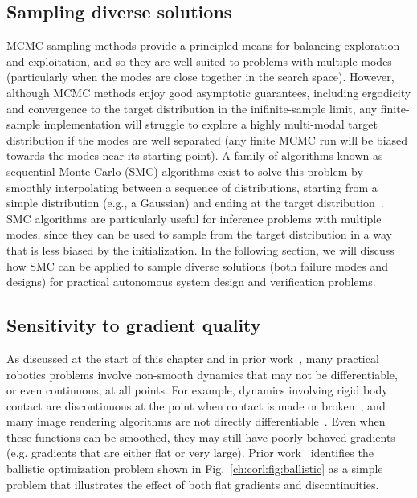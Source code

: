 \subsection{Sampling diverse solutions}

MCMC sampling methods provide a principled means for balancing exploration and exploitation, and so they are well-suited to problems with multiple modes (particularly when the modes are close together in the search space). However, although MCMC methods enjoy good asymptotic guarantees, including ergodicity and convergence to the target distribution in the inifinite-sample limit, any finite-sample implementation will struggle to explore a highly multi-modal target distribution if the modes are well separated (any finite MCMC run will be biased towards the modes near its starting point). A family of algorithms known as sequential Monte Carlo (SMC) algorithms exist to solve this problem by smoothly interpolating between a sequence of distributions, starting from a simple distribution (e.g., a Gaussian) and ending at the target distribution~\cite{chopinIntroductionSequentialMonte2020}. SMC algorithms are particularly useful for inference problems with multiple modes, since they can be used to sample from the target distribution in a way that is less biased by the initialization. In the following section, we will discuss how SMC can be applied to sample diverse solutions (both failure modes and designs) for practical autonomous system design and verification problems.

\subsection{Sensitivity to gradient quality}

As discussed at the start of this chapter and in prior work~\cite{suhDifferentiableSimulatorsGive2022,suh2021_bundled_gradients}, many practical robotics problems involve non-smooth dynamics that may not be differentiable, or even continuous, at all points. For example, dynamics involving rigid body contact are discontinuous at the point when contact is made or broken~\cite{suhDifferentiableSimulatorsGive2022}, and many image rendering algorithms are not directly differentiable~\cite{zhaoPhysicsbasedDifferentiableRendering2020}. Even when these functions can be smoothed, they may still have poorly behaved gradients (e.g. gradients that are either flat or very large). Prior work~\cite{suhDifferentiableSimulatorsGive2022} identifies the ballistic optimization problem shown in Fig.~\ref{ch:corl:fig:ballistic} as a simple problem that illustrates the effect of both flat gradients and discontinuities.

